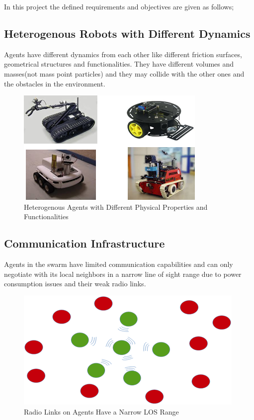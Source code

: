 In this project the defined requirements and objectives are given as follows;

\subsection{Heterogenous Robots with Different Dynamics}
Agents have different dynamics from each other like different friction surfaces, geometrical structures and functionalities. They have different volumes and masses(not mass point particles) and they may collide with the other ones and the obstacles in the environment.

\begin{figure}[H]
\caption{Heterogenous Agents with Different Physical Properties and Functionalities}
\centering
\includegraphics[scale = 1]{heterogenous}
\end{figure}

\subsection{Communication Infrastructure}
Agents in the swarm have limited communication capabilities and can only negotiate with its local neighbors in a narrow line of sight range due to power consumption issues and their weak radio links.

\begin{figure}[H]
\caption{Radio Links on Agents Have a Narrow LOS Range}
\centering
\includegraphics[scale = 1]{narrow_los}
\end{figure}

